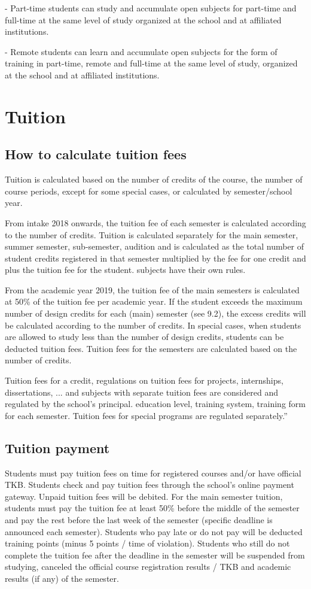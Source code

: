 - Part-time students can study and accumulate open subjects for part-time and full-time at the same level of study organized at the school and at affiliated institutions.

- Remote students can learn and accumulate open subjects for the form of training in part-time, remote and full-time at the same level of study, organized at the school and at affiliated institutions.

\section{Tuition}
\subsection{How to calculate tuition fees}
Tuition is calculated based on the number of credits of the course, the number of course periods, except for some special cases, or calculated by semester/school year.

From intake 2018 onwards, the tuition fee of each semester is calculated according to the number of credits. Tuition is calculated separately for the main semester, summer semester, sub-semester, audition and is calculated as the total number of student credits registered in that semester multiplied by the fee for one credit and plus the tuition fee for the student. subjects have their own rules.

From the academic year 2019, the tuition fee of the main semesters is calculated at 50\% of the tuition fee per academic year. If the student exceeds the maximum number of design credits for each (main) semester (see 9.2), the excess credits will be calculated according to the number of credits. In special cases, when students are allowed to study less than the number of design credits, students can be deducted tuition fees. Tuition fees for the semesters are calculated based on the number of credits.

Tuition fees for a credit, regulations on tuition fees for projects, internships, dissertations, ... and subjects with separate tuition fees are considered and regulated by the school's principal. education level, training system, training form for each semester. Tuition fees for special programs are regulated separately.”

\subsection{Tuition payment}
Students must pay tuition fees on time for registered courses and/or have official TKB. Students check and pay tuition fees through the school's online payment gateway. Unpaid tuition fees will be debited. For the main semester tuition, students must pay the tuition fee at least 50\% before the middle of the semester and pay the rest before the last week of the semester (specific deadline is announced each semester). Students who pay late or do not pay will be deducted training points (minus 5 points / time of violation). Students who still do not complete the tuition fee after the deadline in the semester will be suspended from studying, canceled the official course registration results / TKB and academic results (if any) of the semester.

